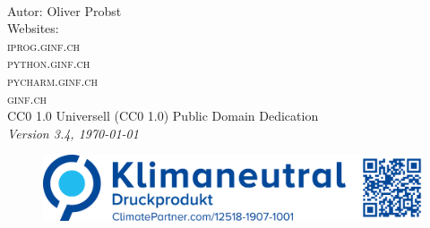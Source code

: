 
\newpage
~\vfill
\thispagestyle{empty}

\noindent Autor: Oliver Probst\\

\noindent Websites:\\
\noindent \textsc{iprog.ginf.ch}\\
\noindent \textsc{python.ginf.ch}\\
\noindent \textsc{pycharm.ginf.ch}\\
\noindent \textsc{ginf.ch}\\

\noindent \ccLogo \hspace{0.1cm} \ccZero \hspace{0.1cm} CC0 1.0 Universell (CC0 1.0) Public Domain Dedication \\

\noindent \textit{Version 3.4, \today}

\begin{figure}[htb]
\includegraphics[scale=0.15]{climate}
\end{figure}
